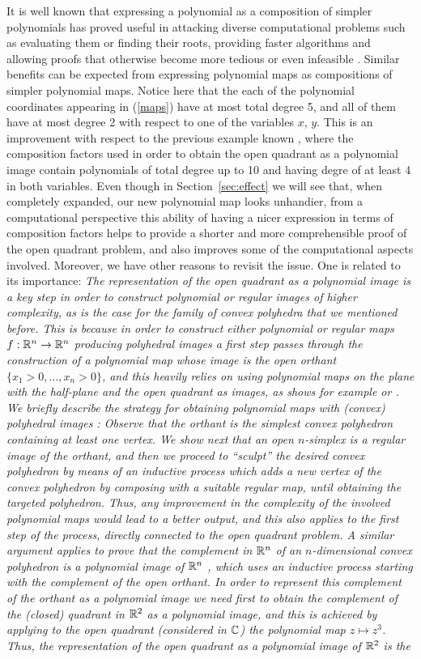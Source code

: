 \documentclass[1p]{elsarticle}
\begin{document}
It is well known that expressing a polynomial as a composition of simpler polynomials has proved useful in attacking diverse computational problems such as evaluating them or finding their roots, providing faster algorithms and allowing proofs that otherwise become more tedious or even infeasible \citep{agr,ggr,kl}. Similar benefits can be expected from expressing polynomial maps as compositions of simpler polynomial maps. Notice here that the each of the polynomial coordinates appearing in (\ref{maps}) have at most total degree 5, and all of them have at most degree 2 with respect to one of the variables $x$, $y$. This is an improvement with respect to the previous example known \citep{fg1}, where the composition factors used in order to obtain the open quadrant as a polynomial image contain  polynomials of total degree up to 10 and having degre of at least 4 in both variables. Even though in Section~\ref{sec:effect} we will see that, when completely expanded, our new polynomial map looks unhandier, from a computational perspective this ability of having a nicer expression in terms of composition factors helps to provide  a shorter and more comprehensible proof of the open quadrant problem, and also improves some of the computational aspects involved. Moreover, we have other reasons to revisit the issue. One is related to its  importance: \em The representation of the open quadrant as a polynomial image is a key step in order to construct polynomial or regular images of higher complexity\em, as is the case for the family of convex polyhedra that we mentioned before. This is because in order to construct either polynomial or regular maps $f:{\mathbb R}^n\to{\mathbb R}^n$ producing polyhedral images a first step passes through the construction of a polynomial map whose image is the open orthant $\{x_1>0,\dots,x_n>0\}$, and this heavily relies on using polynomial maps on the plane with the half-plane and the open quadrant as images, as shows for example \citet[Lemma 4.1]{fgu1} or \citet[Lemma 5.2]{fu2}.  We briefly describe the strategy for obtaining polynomial maps with (convex) polyhedral images \citep{fgu1}: Observe that the orthant is the simplest convex polyhedron containing at least one vertex. We  show next that  an open $n$-simplex is a regular image of the orthant, and then we proceed to ``sculpt'' the desired convex polyhedron by means of an inductive process which adds a new vertex of the convex polyhedron by composing with a suitable regular map, until obtaining the targeted polyhedron. Thus, any improvement in the complexity of the involved polynomial maps would lead to a better output, and this also applies to the first step   of the process, directly connected to the open quadrant problem. A similar argument applies to prove that the complement in ${\mathbb R}^n$ of an $n$-dimensional convex polyhedron is a polynomial image of ${\mathbb R}^n$ \citep{fu2}, which uses  an inductive process starting with the complement of the open orthant. In order to represent this complement of the orthant as a polynomial image we need first to obtain the complement of the (closed) quadrant in ${\mathbb R}^2$  as a polynomial image, and this is achieved by applying to the open quadrant (considered in ${\mathbb C}$) the polynomial map $z\mapsto z^3$. Thus, the representation of the open quadrant as a polynomial image of ${\mathbb R}^2$ is the 
\end{document}
